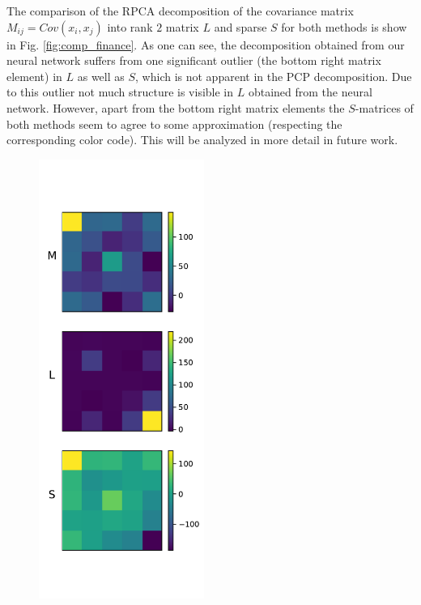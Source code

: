 The comparison of the RPCA decomposition of the covariance matrix $M_{ij} = Cov(x_i,x_j)$ into rank $2$ matrix $L$ and sparse $S$ for both methods is show in Fig. \ref{fig:comp_finance}. As one can see, the decomposition obtained from our neural network suffers from one significant outlier (the bottom right matrix element) in $L$ as well as $S$, which is not apparent in the PCP decomposition. Due to this outlier not much structure is visible in $L$ obtained from the neural network. However, apart from the bottom right matrix elements the $S$-matrices of both methods seem to agree to some approximation (respecting the corresponding color code). This will be analyzed in more detail in future work.

\begin{figure}
	\centering
	\includegraphics[width=0.48\textwidth]{fig/denise_output_finance.pdf}

\end{figure}

